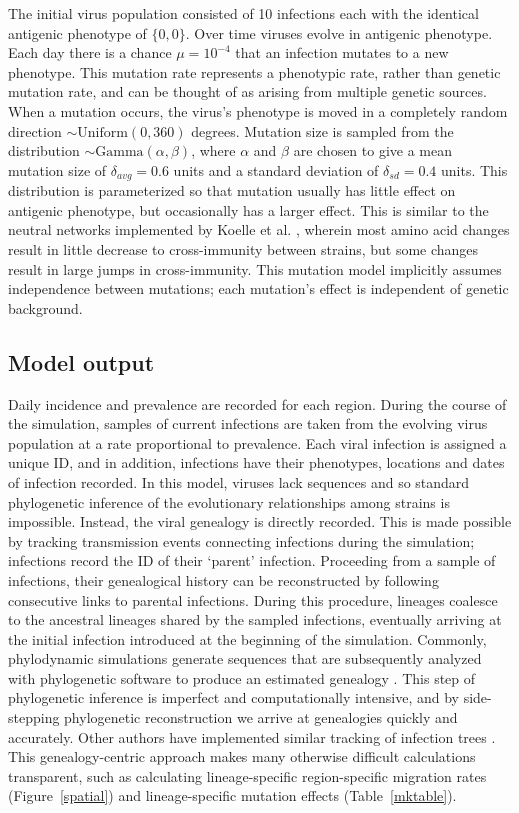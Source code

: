 \documentclass[11pt,oneside,letterpaper]{article}
\begin{document}
The initial virus population consisted of 10 infections each with the identical antigenic phenotype of $\{0,0\}$.  Over time viruses evolve in antigenic phenotype.  Each day there is a chance $\mu = 10^{-4}$ that an infection mutates to a new phenotype.  This mutation rate represents a phenotypic rate, rather than genetic mutation rate, and can be thought of as arising from multiple genetic sources.  When a mutation occurs, the virus's phenotype is moved in a completely random direction $\sim \mathrm{Uniform}(0,360)$ degrees. Mutation size is sampled from the distribution $\sim \mathrm{Gamma}(\alpha,\beta)$, where $\alpha$ and $\beta$ are chosen to give a mean mutation size of $\delta_{avg} = 0.6$ units and a standard deviation of $\delta_{sd} = 0.4$ units.  This distribution is parameterized so that mutation usually has little effect on antigenic phenotype, but occasionally has a larger effect.  This is similar to the neutral networks implemented by Koelle et al. \cite{Koelle06}, wherein most amino acid changes result in little decrease to cross-immunity between strains, but some changes result in large jumps in cross-immunity.  This mutation model implicitly assumes independence between mutations; each mutation's effect is independent of genetic background.

\subsection*{Model output}

Daily incidence and prevalence are recorded for each region.  During the course of the simulation, samples of current infections are taken from the evolving virus population at a rate proportional to prevalence.  Each viral infection is assigned a unique ID, and in addition, infections have their phenotypes, locations and dates of infection recorded.  In this model, viruses lack sequences and so standard phylogenetic inference of the evolutionary relationships among strains is impossible.  Instead, the viral genealogy is directly recorded.  This is made possible by tracking transmission events connecting infections during the simulation; infections record the ID of their `parent' infection.  Proceeding from a sample of infections, their genealogical history can be reconstructed by following consecutive links to parental infections.  During this procedure, lineages coalesce to the ancestral lineages shared by the sampled infections, eventually arriving at the initial infection introduced at the beginning of the simulation.  Commonly, phylodynamic simulations generate sequences that are subsequently analyzed with phylogenetic software to produce an estimated genealogy \cite{Ferguson03,Koelle06,Koelle10}.  This step of phylogenetic inference is imperfect and computationally intensive, and by side-stepping phylogenetic reconstruction we arrive at genealogies quickly and accurately.  Other authors have implemented similar tracking of infection trees \cite{Volz09,Odea11}.  This genealogy-centric approach makes many otherwise difficult calculations transparent, such as calculating lineage-specific region-specific migration rates (Figure~\ref{spatial}) and lineage-specific mutation effects (Table~\ref{mktable}).
\end{document}
